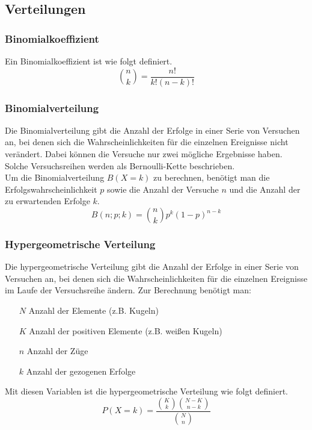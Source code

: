 \documentclass[a4paper]{article}
\begin{document}
		\subsection{Verteilungen}
			\subsubsection{Binomialkoeffizient}
				Ein Binomialkoeffizient ist wie folgt definiert.
				\begin{equation}
					\binom{n}{k} = \frac{n!}{k! (n-k)!}
				\end{equation}
			\subsubsection{Binomialverteilung}
				Die Binomialverteilung gibt die Anzahl der Erfolge in einer Serie von Versuchen an, bei denen sich die Wahrscheinlichkeiten für die einzelnen Ereignisse nicht verändert. Dabei können die Versuche nur zwei mögliche Ergebnisse haben. Solche Versuchsreihen werden als Bernoulli-Kette beschrieben.\\
				Um die Binomialverteilung $B(X = k)$ zu berechnen, benötigt man die Erfolgswahrscheinlichkeit $p$ sowie die Anzahl der Versuche $n$ und die Anzahl der zu erwartenden Erfolge $k$.
				\begin{equation}
					B(n; p; k) = \binom{n}{k} p^k (1 - p)^{n-k}
				\end{equation}
			\subsubsection{Hypergeometrische Verteilung}
				Die hypergeometrische Verteilung gibt die Anzahl der Erfolge in einer Serie von Versuchen an, bei denen sich die Wahrscheinlichkeiten für die einzelnen Ereignisse im Laufe der Versuchsreihe ändern. Zur Berechnung benötigt man:
				\begin{itemize}
					\item[$N$] Anzahl der Elemente (z.B. Kugeln)
					\item[$K$] Anzahl der positiven Elemente (z.B. weißen Kugeln)
					\item[$n$] Anzahl der Züge
					\item[$k$] Anzahl der gezogenen Erfolge
				\end{itemize}
				
				\noindent
				Mit diesen Variablen ist die hypergeometrische Verteilung wie folgt definiert.
				\begin{equation}
					P\left(X = k\right) = \frac{
						\binom{K}{k}
						\binom{N-K}{n-k}
					}{
						\binom{N}{n}
					}
				\end{equation}
			
\end{document}
